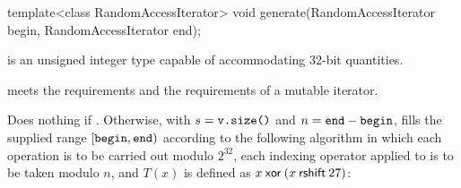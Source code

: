 %
\begin{itemdecl}
template<class RandomAccessIterator>
  void generate(RandomAccessIterator begin, RandomAccessIterator end);
\end{itemdecl}

\begin{itemdescr}
\pnum
\mandates
  is an unsigned integer type capable of accommodating 32-bit quantities.

\pnum
\expects
   meets the
   requirements
  and the requirements of a mutable iterator.

\pnum
\effects
 Does nothing if .
 Otherwise,
 with $s = \tcode{v.size()}$
 and  $n = \tcode{end} - \tcode{begin}$,
 fills the supplied range $[\tcode{begin},\tcode{end})$
 according to the following algorithm
 in which
 each operation is to be carried out modulo $2^{32}$,
 each indexing operator applied to  is to be taken modulo $n$,
 and $T(x)$ is defined as $x \mathbin{\mathsf{xor}} (x \mathbin{\mathsf{rshift}} 27)$:


\end{itemdescr}
